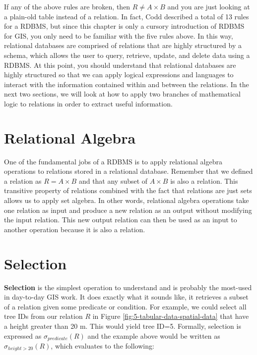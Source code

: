 \documentclass[
]{book}
\begin{document}
If any of the above rules are broken, then \(R≠A×B\) and you are just looking at a plain-old table instead of a relation. In fact, Codd described a total of 13 rules for a RDBMS, but since this chapter is only a cursory introduction of RDBMS for GIS, you only need to be familiar with the five rules above. In this way, relational databases are comprised of relations that are highly structured by a schema, which allows the user to query, retrieve, update, and delete data using a RDBMS. At this point, you should understand that relational databases are highly structured so that we can apply logical expressions and languages to interact with the information contained within and between the relations. In the next two sections, we will look at how to apply two branches of mathematical logic to relations in order to extract useful information.

\section{Relational Algebra}\label{relational-algebra}

One of the fundamental jobs of a RDBMS is to apply relational algebra operations to relations stored in a relational database. Remember that we defined a relation as \(R=A×B\) and that any subset of \(A×B\) is also a relation. This transitive property of relations combined with the fact that relations are just sets allows us to apply set algebra. In other words, relational algebra operations take one relation as input and produce a new relation as an output without modifying the input relation. This new output relation can then be used as an input to another operation because it is also a relation.

\section{Selection}\label{selection}

\textbf{Selection} is the simplest operation to understand and is probably the most-used in day-to-day GIS work. It does exactly what it sounds like, it retrieves a subset of a relation given some predicate or condition. For example, we could select all tree IDs from our relation \(R\) in Figure \ref{fig:5-tabular-data-spatial-data} that have a height greater than 20 m. This would yield tree ID=5. Formally, selection is expressed as \(σ_{predicate}(R)\) and the example above would be written as \(σ_{height>20}(R)\), which evaluates to the following:
\end{document}
